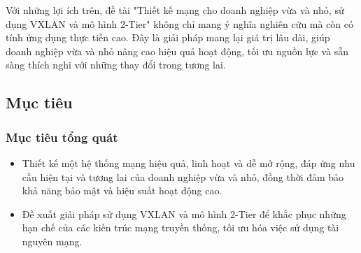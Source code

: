\documentclass[13pt]{article}
\begin{document}
        Với những lợi ích trên, đề tài "Thiết kế mạng cho doanh nghiệp vừa và nhỏ, sử dụng VXLAN và mô hình 2-Tier" không chỉ mang ý nghĩa nghiên cứu mà còn có tính ứng dụng thực tiễn cao. Đây là giải pháp mang lại giá trị lâu dài, giúp doanh nghiệp vừa và nhỏ nâng cao hiệu quả hoạt động, tối ưu nguồn lực và sẵn sàng thích nghi với những thay đổi trong tương lai.
        
    \subsection{Mục tiêu}
    \subsubsection{Mục tiêu tổng quát}
    \begin{itemize}
        \item Thiết kế một hệ thống mạng hiệu quả, linh hoạt và dễ mở rộng, đáp ứng nhu cầu hiện tại và tương lai của doanh nghiệp vừa và nhỏ, đồng thời đảm bảo khả năng bảo mật và hiệu suất hoạt động cao.
        \item Đề xuất giải pháp sử dụng VXLAN và mô hình 2-Tier để khắc phục những hạn chế của các kiến trúc mạng truyền thống, tối ưu hóa việc sử dụng tài nguyên mạng.
    \end{itemize}
\end{document}
